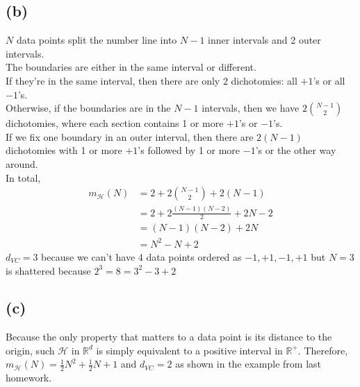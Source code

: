 \documentclass{article}
\begin{document}
	\subsection*{(b)}
		$N$ data points split the number line into $N-1$ inner intervals and 2 outer intervals.\\
		The boundaries are either in the same interval or different.\\
		If they're in the same interval, then there are only 2 dichotomies: all $+1$'s or all $-1$'s.\\
		Otherwise, if the boundaries are in the $N-1$ intervals, then we have $2{N-1 \choose 2}$ dichotomies, where each section contains 1 or more $+1$'s or $-1$'s.\\
		If we fix one boundary in an outer interval, then there are $2(N-1)$ dichotomies with 1 or more $+1$'s followed by 1 or more $-1$'s or the other way around.\\
		In total,
		\begin{align*}
			m_{\mathcal H}(N) &= 2 + 2{N-1 \choose 2} + 2(N-1)\\
			&= 2 + 2\frac{(N-1)(N-2)}2 + 2N - 2\\
			&= (N-1)(N-2) + 2N\\
			&= \boxed{N^2 - N + 2}
		\end{align*}
		$d_{VC} = \boxed 3$ because we can't have 4 data points ordered as $-1, +1, -1, +1$ but $N = 3$ is shattered because $2^3 = 8 = 3^2 - 3 + 2$
		
	\subsection*{(c)}
		Because the only property that matters to a data point is its distance to the origin, such $\mathcal H$ in $\mathbb R^d$ is simply equivalent to a positive interval in $\mathbb R^+$. Therefore, $m_{\mathcal H}(N) = \boxed{\frac12 N^2 + \frac12 N + 1}$ and $d_{VC} = \boxed 2$ as shown in the example from last homework.
		
\end{document}
